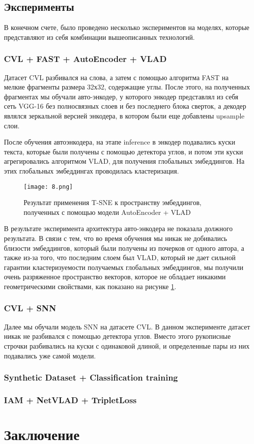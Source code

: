 \subsection{Эксперименты}

В конечном счете, было проведено несколько экспериментов на моделях, которые представляют из себя комбинации вышеописанных технологий. 

\subsubsection{CVL + FAST + AutoEncoder + VLAD}

Датасет CVL разбивался на слова, а затем с помощью алгоритма FAST на мелкие фрагменты размера 32х32, содержащие углы. После этого, на полученных фрагментах мы обучали авто-энкодер, у которого энкодер представлял из себя сеть VGG-16 без полносвязных слоев и без последнего блока сверток, а декодер являлся зеркальной версией энкодера, в котором были еще добавлены upsample слои.

После обучения автоэнкодера, на этапе inference в энкодер подавались куски текста, которые были получены с помощью детектора углов, и потом эти куски агрегировались алгоритмом VLAD, для получения глобальных эмбеддингов. На этих глобальных эмбеддингах проводилась кластеризация. 

\begin{figure}[htbp]
    \centering
    \texttt{[image: 8.png]}
    \captionsetup{width=0.9\textwidth}
    \caption{Результат применения T-SNE к пространству эмбеддингов, полученных с помощью модели AutoEncoder + VLAD}
    \label{fig:autoencoder_result}
\end{figure}

В результате эксперимента архитектура авто-энкодера не показала должного результата. В связи с тем, что во время обучения мы никак не добивались близости эмбеддингов, который были получены из почерков от одного автора, а также из-за того, что последним слоем был VLAD, который не дает сильной гарантии кластеризуемости получаемых глобальных эмбеддингов, мы получили очень разряженное пространство векторов, которое не обладает никакими геометрическими свойствами, как показано на рисунке \ref{fig:autoencoder_result}.

\subsubsection{CVL + SNN}

Далее мы обучали модель SNN на датасете CVL. В данном эксперименте датасет никак не разбивался с помощью детектора углов. Вместо этого рукописные строчки разбивались на куски с одинаковой длиной, и определенные пары из них подавались уже самой модели. 

\subsubsection{Synthetic Dataset + Classification training}

\subsubsection{IAM + NetVLAD + TripletLoss}

\newpage
\section{Заключение}